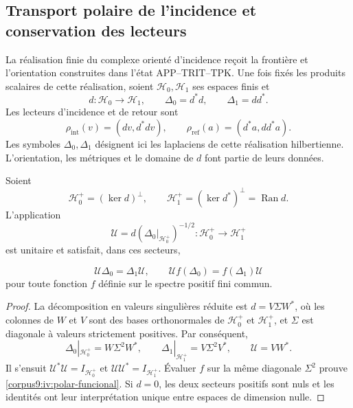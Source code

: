 \subsection{Transport polaire de l’incidence et conservation des lecteurs}
\label{corpus9:iv:polar}

La réalisation finie du complexe orienté d’incidence
reçoit la frontière et l’orientation construites dans l’état
APP--TRIT--TPK. Une fois fixés les produits scalaires de
cette réalisation, soient \(\mathcal H_0,\mathcal H_1\) ses
espaces finis et
\[
 d:\mathcal H_0\longrightarrow\mathcal H_1,\qquad
 \Delta_0=d^*d,\qquad \Delta_1=dd^*.
\]
Les lecteurs d’incidence et de retour sont
\[
 \rho_{\mathrm{int}}(v)=(dv,d^*dv),\qquad
 \rho_{\mathrm{ref}}(a)=(d^*a,dd^*a).
\]
Les symboles \(\Delta_0,\Delta_1\) désignent ici les
laplaciens de cette réalisation hilbertienne. L’orientation,
les métriques et le domaine de \(d\) font partie de leurs données.

\begin{proposition}
\label{corpus9:iv:polar-transporte}
Soient
\[
 \mathcal H_0^+=(\ker d)^\perp,\qquad
 \mathcal H_1^+=(\ker d^*)^\perp=\operatorname{Ran}d.
\]
L'application
\begin{equation}
 \mathcal U=d(\Delta_0|_{\mathcal H_0^+})^{-1/2}
    :\mathcal H_0^+\longrightarrow\mathcal H_1^+
 \label{corpus9:iv:polar-operador}
\end{equation}
est unitaire et satisfait, dans ces secteurs,

\begin{equation}
 \mathcal U\Delta_0=\Delta_1\mathcal U,\qquad
 \mathcal U f(\Delta_0)=f(\Delta_1)\mathcal U
 \label{corpus9:iv:polar-funcional}
\end{equation}
pour toute fonction \(f\) définie sur le spectre positif
fini commun.

\end{proposition}
\begin{proof}
La décomposition en valeurs singulières réduite est \(d=V\Sigma W^*\),
où les colonnes de \(W\) et \(V\) sont des bases orthonormales
de \(\mathcal H_0^+\) et \(\mathcal H_1^+\), et \(\Sigma\)
est diagonale à valeurs strictement positives. Par conséquent,
\[
 \Delta_0|_{\mathcal H_0^+}=W\Sigma^2W^*,\qquad
 \Delta_1|_{\mathcal H_1^+}=V\Sigma^2V^*,\qquad
 \mathcal U=VW^*.
\]
Il s’ensuit \(\mathcal U^*\mathcal U=I_{\mathcal H_0^+}\) et
\(\mathcal U\mathcal U^*=I_{\mathcal H_1^+}\). Évaluer \(f\)
sur la même diagonale \(\Sigma^2\) prouve
\eqref{corpus9:iv:polar-funcional}. Si \(d=0\), les deux
secteurs positifs sont nuls et les identités ont leur
interprétation unique entre espaces de dimension nulle.
\end{proof}

